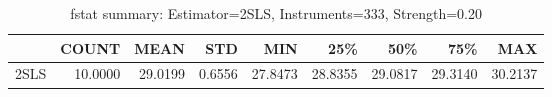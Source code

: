 \begin{table}[ht]
\centering
\caption{fstat summary: Estimator=2SLS, Instruments=333, Strength=0.20}
\begin{tabular}{lrrrrrrrr}
\toprule
 & COUNT & MEAN & STD & MIN & 25\% & 50\% & 75\% & MAX \\
\midrule
2SLS & 10.0000 & 29.0199 & 0.6556 & 27.8473 & 28.8355 & 29.0817 & 29.3140 & 30.2137 \\
\bottomrule
\end{tabular}
\end{table}
